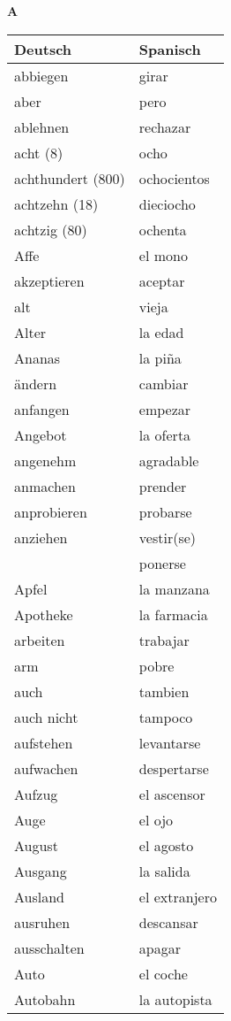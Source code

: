 \begin{flushright}\begin{Huge}\textbf{A}\end{Huge}\end{flushright}

\begin{longtable}{p{} p{}} 
\textbf{Deutsch}     & \textbf{Spanisch}                                       \\ \hline
\hline
\endhead %
abbiegen & girar\\
aber & pero\\
ablehnen & rechazar\\
acht (8) & ocho\\
achthundert (800) & ochocientos\\
achtzehn (18) & dieciocho\\
achtzig (80) & ochenta\\
Affe & el mono\\
akzeptieren & aceptar\\
alt & vieja\\
Alter & la edad\\
Ananas & la piña\\
ändern & cambiar\\
anfangen & empezar\\
Angebot & la oferta \\
angenehm & agradable\\
anmachen & prender\\
anprobieren & probarse\\
anziehen & vestir(se)\\
~ & ponerse\\
Apfel & la manzana \\
Apotheke & la farmacia\\
arbeiten & trabajar\\
arm & pobre\\
auch & tambien\\
auch nicht & tampoco\\
aufstehen & levantarse\\
aufwachen & despertarse\\
Aufzug & el ascensor\\
Auge & el ojo\\
August & el agosto\\
Ausgang & la salida\\
Ausland & el extranjero\\
ausruhen & descansar\\
ausschalten & apagar\\
Auto & el coche \\
Autobahn & la autopista\\
\end{longtable}

